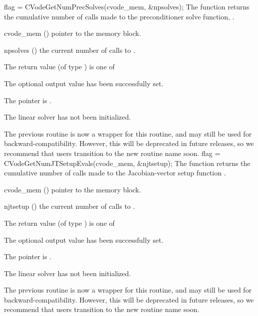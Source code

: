 {
  flag = CVodeGetNumPrecSolves(cvode\_mem, \&npsolves);
}
{
  The function  returns the
  cumulative number of calls made to the preconditioner
  solve function, .
}
{
  \begin{args}
  \item[cvode\_mem] ()
    pointer to the {\cvodes} memory block.
  \item[npsolves] ()
    the current number of calls to .
  \end{args}
}
{
  The return value  (of type ) is one of
  \begin{args}
  \item[\Id{CVLS\_SUCCESS}]
    The optional output value has been successfully set.
  \item[\Id{CVLS\_MEM\_NULL}]
    The  pointer is .
  \item[\Id{CVLS\_LMEM\_NULL}]
    The {\cvls} linear solver has not been initialized.
  \end{args}
}
{
  The previous routine  is now a wrapper for
  this routine, and may still be used for backward-compatibility.
  However, this will be deprecated in future releases, so we recommend
  that users transition to the new routine name soon.
}
{
  flag = CVodeGetNumJTSetupEvals(cvode\_mem, \&njtsetup);
}
{
  The function  returns the
  cumulative number of calls made to the Jacobian-vector setup
  function .
}
{
  \begin{args}
  \item[cvode\_mem] ()
    pointer to the {\cvodes} memory block.
  \item[njtsetup] ()
    the current number of calls to .
  \end{args}
}
{
  The return value  (of type ) is one of
  \begin{args}
  \item[\Id{CVLS\_SUCCESS}]
    The optional output value has been successfully set.
  \item[\Id{CVLS\_MEM\_NULL}]
    The  pointer is .
  \item[\Id{CVLS\_LMEM\_NULL}]
    The {\cvls} linear solver has not been initialized.
  \end{args}
}
{
  The previous routine  is now a wrapper for
  this routine, and may still be used for backward-compatibility.
  However, this will be deprecated in future releases, so we recommend
  that users transition to the new routine name soon.
}
